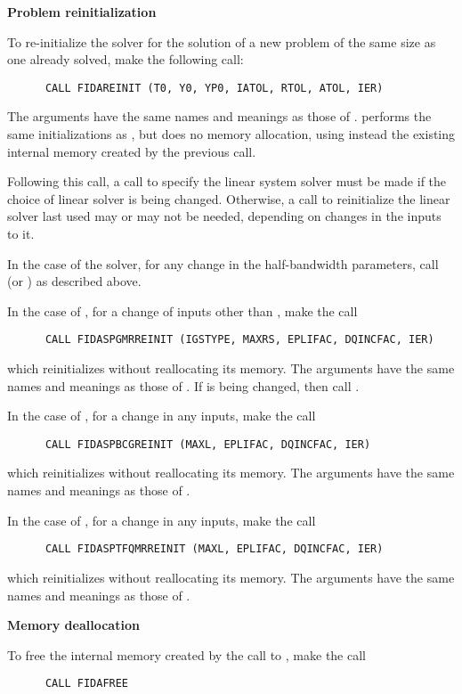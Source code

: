 \begin{Steps}
\item {\bf Problem reinitialization}

  To re-initialize the {\ida} solver for the solution of a new problem
  of the same size as one already solved, make the following call:
\begin{verbatim}
      CALL FIDAREINIT (T0, Y0, YP0, IATOL, RTOL, ATOL, IER)
\end{verbatim}
  The arguments have the same names and meanings as those of .
   performs the same initializations as , but
  does no memory allocation, using instead the existing internal memory
  created by the previous  call.

  Following this call, a call to specify the linear system solver must be
  made if the choice of linear solver is being changed.  Otherwise, a call
  to reinitialize the linear solver last used may or may not be needed,
  depending on changes in the inputs to it.

  In the case of the {\band} solver, for any change in the half-bandwidth
  parameters, call  (or ) as described above.

  In the case of {\spgmr}, for a change of inputs other than ,
  make the call
\begin{verbatim}
      CALL FIDASPGMRREINIT (IGSTYPE, MAXRS, EPLIFAC, DQINCFAC, IER)
\end{verbatim}
  which reinitializes {\spgmr} without reallocating its memory.
  The arguments have the same names and meanings as those of .
  If  is being changed, then call .

  In the case of {\spbcg}, for a change in any inputs, make the call
\begin{verbatim}
      CALL FIDASPBCGREINIT (MAXL, EPLIFAC, DQINCFAC, IER)
\end{verbatim}
  which reinitializes {\spbcg} without reallocating its memory.
  The arguments have the same names and meanings as those of .

  In the case of {\sptfqmr}, for a change in any inputs, make the call
\begin{verbatim}
      CALL FIDASPTFQMRREINIT (MAXL, EPLIFAC, DQINCFAC, IER)
\end{verbatim}
  which reinitializes {\sptfqmr} without reallocating its memory.
  The arguments have the same names and meanings as those of .

\item {\bf Memory deallocation}

  To free the internal memory created by the call to ,
  make the call
\begin{verbatim}
      CALL FIDAFREE
\end{verbatim}

\end{Steps}

